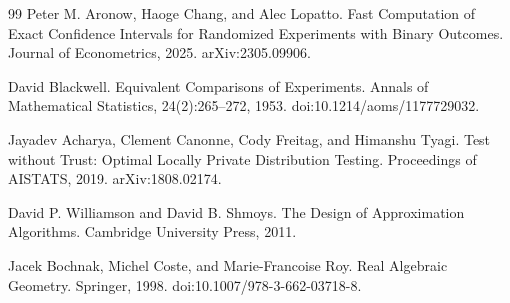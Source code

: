 \documentclass{article}
\begin{document}
\begin{thebibliography}{99}
   Peter M. Aronow, Haoge Chang, and Alec Lopatto. Fast Computation of Exact Confidence Intervals for Randomized Experiments with Binary Outcomes. Journal of Econometrics, 2025. arXiv:2305.09906.

   David Blackwell. Equivalent Comparisons of Experiments. Annals of Mathematical Statistics, 24(2):265--272, 1953. doi:10.1214/aoms/1177729032.

   Jayadev Acharya, Clement Canonne, Cody Freitag, and Himanshu Tyagi. Test without Trust: Optimal Locally Private Distribution Testing. Proceedings of AISTATS, 2019. arXiv:1808.02174.

   David P. Williamson and David B. Shmoys. The Design of Approximation Algorithms. Cambridge University Press, 2011.

   Jacek Bochnak, Michel Coste, and Marie-Francoise Roy. Real Algebraic Geometry. Springer, 1998. doi:10.1007/978-3-662-03718-8.

\end{thebibliography}
\end{document}

